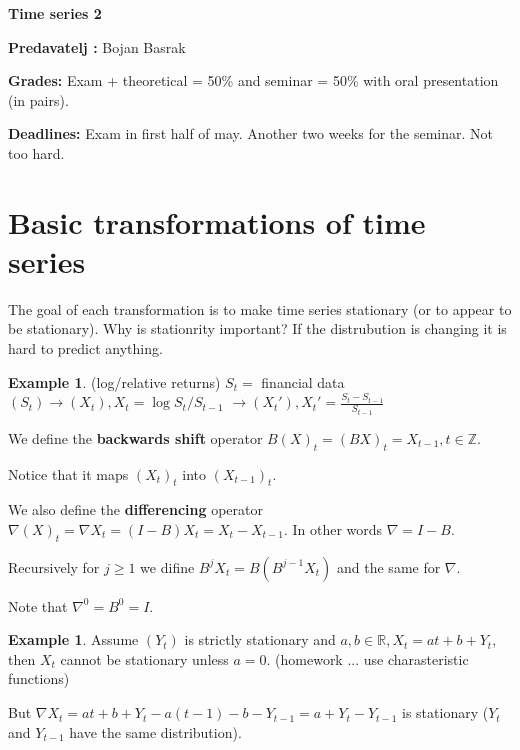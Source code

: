 \documentclass[12pt,a4paper]{amsart}
\theoremstyle{definition} %
\newtheorem{example}[defn]{Example}
\theoremstyle{plain} %
\newcommand{\R}{\mathbb R}
\newcommand{\Z}{\mathbb Z}
\begin{document}
{\bf \huge Time series 2}

\vskip1cm

{\bf Predavatelj : } Bojan Basrak


{\bf Grades: } Exam + theoretical = 50\% and seminar = 50\% with oral presentation (in pairs).

{\bf Deadlines: } Exam in first half of may. Another two weeks for the seminar. Not too hard.

\section{Basic transformations of time series}

\vskip1cm

The goal of each transformation is to make time series stationary (or to appear to be stationary).
Why is stationrity important? If the distrubution is changing it is hard to predict anything.


\begin{example} (log/relative returns)
$S_t =$ financial data
$(S_t) \rightarrow (X_t), X_t = \log{S_t/S_{t-1}} $
$ \rightarrow (X_t'), X_t' = \frac{S_t - S_{t-1}}{S_{t-1}}$
\end{example}

We define the {\bf backwards shift} operator 
$B(X)_t = (BX)_t = X_{t-1}, t \in \Z$.

Notice that it maps $(X_t)_t$ into $(X_{t-1})_t$.

We also define the {\bf differencing} operator $\nabla(X)_t = \nabla X_t = (I - B) X_t = X_t - X_{t-1}$. In other words
$\nabla = I - B$.

Recursively for $j \geq 1$ we difine $B^j X_t = B (B^{j-1} X_t)$ and the same for $\nabla$.

Note that $\nabla^0 = B^0 = I$. 

\begin{example}
Assume $(Y_t)$ is strictly stationary and $a,b \in \R, X_t = a t + b + Y_t$, then $X_t$ cannot be stationary unless $a = 0$. (homework ... use charasteristic functions)

But 
$\nabla X_t = at + b + Y_t - a(t-1) - b - Y_{t-1} = a + Y_t - Y_{t-1}$ is stationary ($Y_t$ and $Y_{t-1}$ have the same distribution).  
\end{example}
\end{document}
